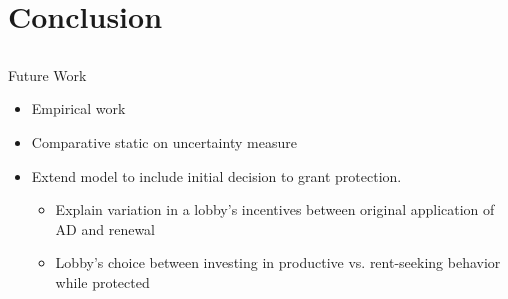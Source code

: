 \documentclass[handout]{beamer}
\begin{document}
\section{Conclusion}
\subsection{}
\begin{frame}{Future Work}
\pause
\begin{itemize}[<+->]
	\item Empirical work
	\item Comparative static on uncertainty measure
	\item Extend model to include initial decision to grant protection.
		\begin{itemize}
			\item Explain variation in a lobby's incentives between original application of AD and renewal
			\item Lobby's choice between investing in productive vs. rent-seeking behavior while protected
		\end{itemize}
\end{itemize}
\end{frame}

\begin{comment}
\begin{frame}{Feedback, Comments from InsTED presentation}
\begin{itemize}[<+->]
	\item Look for Kara Reynold's ``Political Economy of Antidumping Reviews (Shushanik)
	\item Need to have first stage (Jee-Hyeong, Gary Lyn)
		\begin{itemize}
			\item Look at Park and Blonigen (Jee-Hyeong)
			\item Cost differential for firms to get initial duties vs. renewal?
			\item Some firms choose not to pursue renewal when DOC contacts them 30-days before (Sasha)
		\end{itemize}
	\item Lobbying effort may be endogenous: if prob. of success is lower, maybe it's not worth providing effort (Mostafa)
	\item Uncertainty could be, in part, about how mobile labor is (Kishore)
\end{itemize}

\end{frame}
\end{comment}
\end{document}
